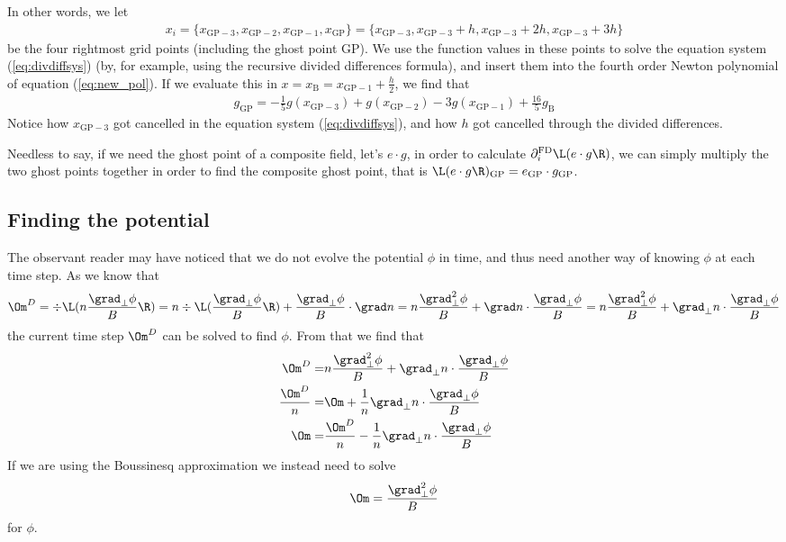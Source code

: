 In other words, we let
\begin{align*}
x_i =
\{x_{\text{GP}-3}, x_{\text{GP}-2}, x_{\text{GP}-1}, x_\text{GP}\}=
\{x_{\text{GP}-3}, x_{\text{GP}-3}+h, x_{\text{GP}-3}+2h, x_{\text{GP}-3}+3h\}
\end{align*}
%
be the four rightmost grid points (including the ghost point $\text{GP}$). We
use the function values in these points to solve the equation system
(\ref{eq:divdiffsys}) (by, for example, using the recursive divided differences
formula), and insert them into the fourth order Newton polynomial of equation
(\ref{eq:new_pol}). If we evaluate this in
$x=x_\text{B}=x_{\text{GP}-1} +\frac{h}{2}$, we find that
%
\begin{align*}
    g_\text{GP} =
    -\frac{1}{5}g(x_{\text{GP}-3})
    + g(x_{\text{GP}-2})
    -3g(x_{\text{GP}-1})
    +\frac{16}{5}g_{\text{B}}
\end{align*}
%
Notice how $x_{\text{GP}-3}$ got cancelled in the equation system
(\ref{eq:divdiffsys}), and how $h$ got cancelled through the divided differences.

Needless to say, if we need the ghost point of a composite field, let's $e\cdot
g$, in order to calculate $\partial_i^{\text{FD}} \L(e\cdot g\R)$, we can
simply multiply the two ghost points together in order to find the composite
ghost point, that is $\L(e \cdot g\R)_\text{GP} = e_\text{GP}\cdot g_\text{GP}$.


\subsection{Finding the potential}
The observant reader may have noticed that we do not evolve the potential $\phi$
in time, and thus need another way of knowing $\phi$ at each time step. As we
know that
%
\begin{align*}
    \Om^D = \div\L(n\frac{\grad_\perp\phi}{B}\R)
    = n\div\L(\frac{\grad_\perp\phi}{B}\R) +
    \frac{\grad_\perp\phi}{B}\cdot\grad n
    = n\frac{\grad_\perp^2\phi}{B} +
    \grad n\cdot\frac{\grad_\perp\phi}{B}
    = n\frac{\grad_\perp^2\phi}{B} +
    \grad_\perp n\cdot\frac{\grad_\perp\phi}{B}
\end{align*}
%
the current time step $\Om^D$ can be solved to find $\phi$. From that we find
that
%
\begin{align*}
    \Om^D =& n\frac{\grad_\perp^2\phi}{B} +
    \grad_\perp n\cdot\frac{\grad_\perp\phi}{B}
    \\
    \frac{\Om^D}{n} =& \Om +
    \frac{1}{n}\grad_\perp n\cdot\frac{\grad_\perp\phi}{B}
    \\
    \Om =& \frac{\Om^D}{n} -
    \frac{1}{n}\grad_\perp n\cdot\frac{\grad_\perp\phi}{B}
\end{align*}
%
If we are using the
Boussinesq approximation we instead need to solve
%
\begin{align*}
    \Om = \frac{\grad_\perp^2\phi}{B}
\end{align*}
%
for $\phi$.


